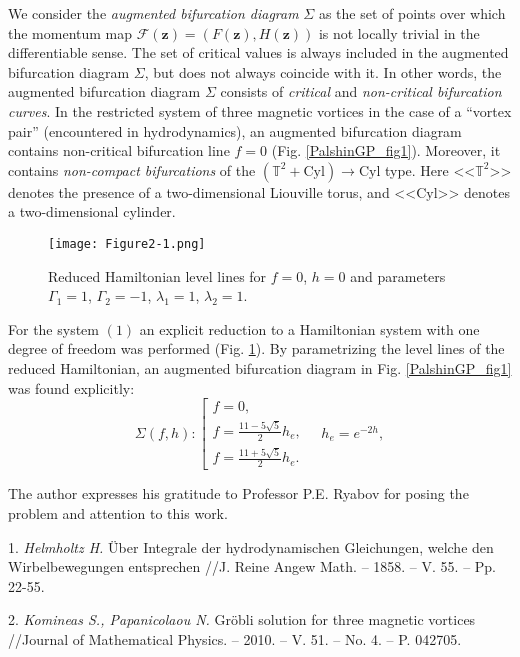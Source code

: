 We consider the \textit{augmented bifurcation diagram} $\Sigma$ as the set of points over which the momentum map $\mathcal{F}(\boldsymbol{z})=(F(\boldsymbol{z}),H(\boldsymbol{z}))$ is not locally trivial in the differentiable sense. The set of critical values is always included in the augmented bifurcation diagram $\Sigma$, but does not always coincide with it. In other words, the augmented bifurcation diagram $\Sigma$ consists of \textit{critical} and \textit{non-critical bifurcation curves}. In the restricted system of three magnetic vortices in the case of a ``vortex pair'' (encountered in hyd\-ro\-dyna\-mics), an augmented bifurcation diagram contains non-critical bifurcation line $f=0$ (Fig. \ref{PalshinGP_fig1}). Moreover, it contains \textit{non-compact bifurcations} of the $\left( \mathbb{T}^2 + \mathrm{Cyl} \right) \rightarrow \mathrm{Cyl}$ type. Here <<$\mathbb{T}^2$>> denotes the presence of a two-dimensional Liouville torus, and <<$\mathrm{Cyl}$>> denotes a two-dimensional cylinder.

\begin{figure}[!t]
	\centering
	\texttt{[image: Figure2-1.png]}
	\caption{Reduced Hamiltonian level lines for $f=0$, $h = 0$ and parameters $\Gamma_1=1$, $\Gamma_2=-1$, $\lambda_1=1$, $\lambda_2=1$.}\label{PalshinGP_fig2}
\end{figure}

For the system $(1)$ an explicit reduction to a Hamiltonian system with one degree of freedom was performed (Fig. \ref{PalshinGP_fig2}). By pa\-ra\-met\-ri\-zing the level lines of the reduced Hamiltonian, an aug\-men\-ted bi\-fur\-ca\-tion diagram in Fig. \ref{PalshinGP_fig1} was found explicitly:
\begin{equation*}
\Sigma(f,h): \left[
\begin{array}{l}
\displaystyle{
f=0,}
\\[3mm]
\displaystyle{
f=\frac{11-5\sqrt{5}}{2} h_e,}
\\[3mm]
\displaystyle{
f=\frac{11+5\sqrt{5}}{2} h_e.}
\end{array}
\right.
\quad
h_e=e^{-2h},
\end{equation*}

The author expresses his gratitude to Professor P.E. Ryabov for posing the problem and attention to this work.

\litlist

1. {\it Helmholtz H.}
\"{U}ber Integrale der hydrodynamischen Glei\-chun\-gen, welche den Wirbelbewegungen entsprechen //J. Reine Angew Math. -- 1858. -- V. 55. -- Pp. 22-55.

2. {\it Komineas S., Papanicolaou N.}
 Gr\"{o}bli solution for three magnetic vortices //Journal of Mathematical Physics. -- 2010. -- V. 51. -- No. 4. -- P. 042705.
%
%

